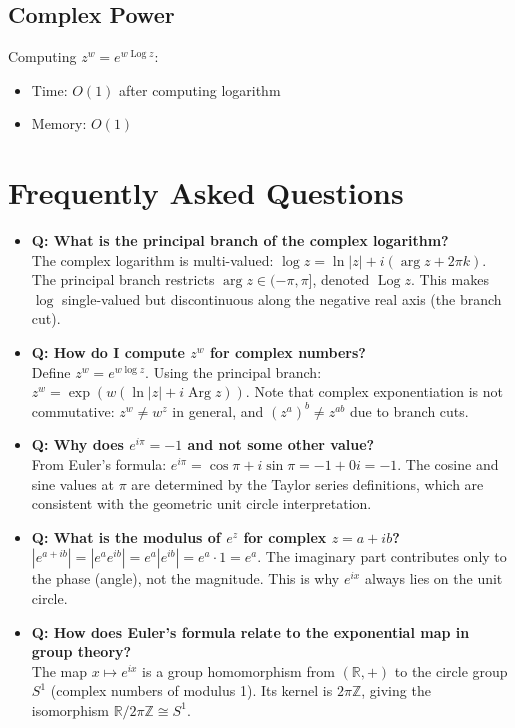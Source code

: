 \subsection{Complex Power}
Computing $z^w = e^{w \operatorname{Log} z}$:
\begin{itemize}
\item Time: $O(1)$ after computing logarithm
\item Memory: $O(1)$
\end{itemize}

\section{Frequently Asked Questions}

\begin{itemize}
\item \textbf{Q: What is the principal branch of the complex logarithm?} \\
The complex logarithm is multi-valued: $\log z = \ln|z| + i(\arg z + 2\pi k)$. The principal branch restricts $\arg z \in (-\pi, \pi]$, denoted $\operatorname{Log} z$. This makes $\log$ single-valued but discontinuous along the negative real axis (the branch cut).

\item \textbf{Q: How do I compute $z^w$ for complex numbers?} \\
Define $z^w = e^{w \log z}$. Using the principal branch: $z^w = \exp(w (\ln|z| + i \operatorname{Arg} z))$. Note that complex exponentiation is not commutative: $z^w \neq w^z$ in general, and $(z^a)^b \neq z^{ab}$ due to branch cuts.

\item \textbf{Q: Why does $e^{i\pi} = -1$ and not some other value?} \\
From Euler's formula: $e^{i\pi} = \cos \pi + i \sin \pi = -1 + 0i = -1$. The cosine and sine values at $\pi$ are determined by the Taylor series definitions, which are consistent with the geometric unit circle interpretation.

\item \textbf{Q: What is the modulus of $e^z$ for complex $z = a + ib$?} \\
$|e^{a+ib}| = |e^a e^{ib}| = e^a |e^{ib}| = e^a \cdot 1 = e^a$. The imaginary part contributes only to the phase (angle), not the magnitude. This is why $e^{ix}$ always lies on the unit circle.

\item \textbf{Q: How does Euler's formula relate to the exponential map in group theory?} \\
The map $x \mapsto e^{ix}$ is a group homomorphism from $(\mathbb{R}, +)$ to the circle group $S^1$ (complex numbers of modulus 1). Its kernel is $2\pi\mathbb{Z}$, giving the isomorphism $\mathbb{R}/2\pi\mathbb{Z} \cong S^1$.


\end{itemize}
